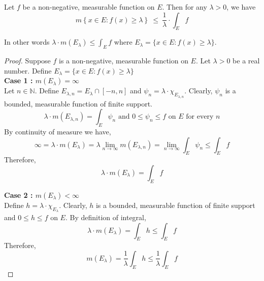 \begin{theorem}
	Let $f$ be a non-negative, measurable function on $E$.
	Then for any $\lambda > 0$, we have
	\begin{equation}
		m\left\{x \in E : f(x) \ge \lambda \right\}\ \le\ \frac{1}{\lambda} \cdot \int_E f
	\end{equation}
	\label{thm:chebychev}
\end{theorem}
	In other words $\displaystyle \lambda \cdot m \left( E_\lambda \right) \le \int_E f$ where $E_\lambda = \{ x \in E : f(x) \ge \lambda \}$.
\begin{proof}
	Suppose $f$ is a non-negative, measurable function on $E$.
	Let $\lambda > 0$ be a real number.
	Define $E_\lambda = \{ x \in E : f(x) \ge \lambda \}$\\

	\textbf{Case 1 : $m(E_\lambda) = \infty$}\\
	Let $n \in \mathbb{N}$.
	Define $E_{\lambda,n} = E_\lambda \cap [-n,n]$ and $\psi_n = \lambda \cdot \chi_{E_{\lambda,n}}$.
	Clearly, $\psi_n$ is a bounded, measurable function of finite support.
	\[ \lambda\cdot m(E_{\lambda,n}) = \int_E \psi_n \text{ and } 0 \le \psi_n \le f \text{ on $E$ for every $n$} \]
	By continuity of measure we have,
	\[ \infty = \lambda \cdot m(E_\lambda) = \lambda \lim_{n \to \infty} m(E_{\lambda,n}) = \lim_{n \to \infty} \int_E \psi_n \le \int_E f \]
	Therefore,
	\[ \lambda \cdot m(E_\lambda) = \int_E f \]

	\textbf{Case 2 : $m(E_\lambda) <\infty$}\\
	Define $h = \lambda \cdot \chi_{E_\lambda}$.
	Clearly, $h$ is a bounded, measurable function of finite support and $0 \le h \le f$ on $E$.
	By definition of integral,
	\[ \lambda \cdot m(E_\lambda) = \int_E h \le \int_E f \]
	Therefore,
	\[ m(E_\lambda) = \frac{1}{\lambda} \int_E h \le \frac{1}{\lambda} \int_E f \]
\end{proof}


